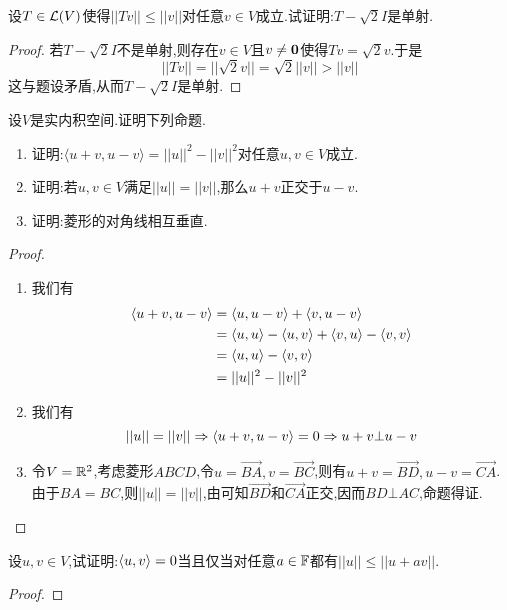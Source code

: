 \documentclass{ctexart}
\begin{document}
\begin{problem}[4.]
    设$T\in\mathcal{L}(V)$使得$||Tv||\leqslant||v||$对任意$v\in V$成立.试证明:$T-\sqrt2I$是单射.
\end{problem}
\begin{proof}
    若$T-\sqrt2I$不是单射,则存在$v\in V$且$v\neq\mathbf0$使得$Tv=\sqrt2v$.于是
    \[||Tv||=||\sqrt2v||=\sqrt2||v||>||v||\]
    这与题设矛盾,从而$T-\sqrt2I$是单射.
\end{proof}
\begin{problem}[5.]
    设$V$是实内积空间.证明下列命题.
    \begin{enumerate}[label=\tbf{(\arabic*)}]
        \item 证明:$\langle u+v,u-v\rangle=||u||^2-||v||^2$对任意$u,v\in V$成立.
        \item 证明:若$u,v\in V$满足$||u||=||v||$,那么$u+v$正交于$u-v$.
        \item 证明:菱形的对角线相互垂直.
    \end{enumerate}
\end{problem}
\begin{proof}
    \begin{enumerate}[label=\tbf{(\arabic*)}]
        \item 我们有
            \[\begin{aligned}
                \langle u+v,u-v\rangle
                &= \langle u,u-v\rangle+\langle v,u-v\rangle \\
                &= \langle u,u\rangle-\langle u,v\rangle+\langle v,u\rangle-\langle v,v\rangle \\
                &= \langle u,u\rangle-\left\langle{v},{v}\right\rangle \\
                &= ||u||^2-||v||^2
            \end{aligned}\]
        \item 我们有
            \[||u||=||v||\Rightarrow \left\langle{u+v},{u-v}\right\rangle=0\Rightarrow u+v\bot u-v\]
        \item 令$V=\mathbb{R}^2$,考虑菱形$ABCD$,令$u=\overrightarrow{BA},v=\overrightarrow{BC}$,则有$u+v=\overrightarrow{BD},u-v=\overrightarrow{CA}$.\\
            由于$BA=BC$,则$||u||=||v||$,由可知$\overrightarrow{BD}$和$\overrightarrow{CA}$正交,因而$BD\bot AC$,命题得证.
    \end{enumerate}
\end{proof}
\begin{problem}[6.]
    设$u,v\in V$,试证明:$\left\langle{u},{v}\right\rangle=0$当且仅当对任意$a\in\mathbb{F}$都有$||u||\leqslant||u+av||$.
\end{problem}
\begin{proof}
    
\end{proof}
\end{document}
